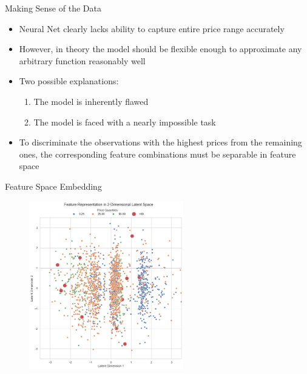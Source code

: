 \documentclass[ngerman,inputenc]{beamer}
\begin{document}
\begin{frame}{Making Sense of the Data}
  \begin{itemize}
    \item Neural Net clearly lacks ability to capture entire price range accurately
    \item However, in theory the model should be flexible enough to approximate any arbitrary function reasonably well
    \item Two possible explanations:
          \begin{enumerate}
            \item The model is inherently flawed
            \item The model is faced with a nearly impossible task
          \end{enumerate}
    \item To discriminate the observations with the highest prices from the remaining ones, the corresponding feature combinations must be separable in feature space
  \end{itemize}
\end{frame}

\begin{frame}{Feature Space Embedding}
  \begin{figure}[t]
    \centering
    \includegraphics[width=0.6\textwidth]{latent_representation.png}
    \label{fig:latent-representation}
  \end{figure}
\end{frame}
\end{document}
